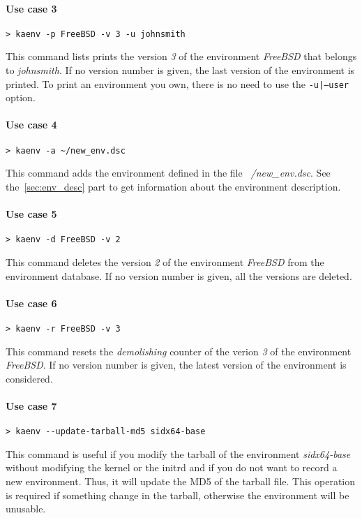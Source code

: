 \documentclass[a4wide,10pt,oneside]{book}
\begin{document}
\paragraph{Use case 3}
\begin{verbatim}
> kaenv -p FreeBSD -v 3 -u johnsmith
\end{verbatim}
This command lists prints the version \textit{3} of the environment \textit{FreeBSD} that belongs to \textit{johnsmith}. If no version number is given, the last version of the environment is printed. To print an environment you own, there is no need to use the \texttt{-u|--user} option.

\paragraph{Use case 4}
\begin{verbatim}
> kaenv -a ~/new_env.dsc
\end{verbatim}
This command adds the environment defined in the file \textit{~/new\_env.dsc}. See the~\ref{sec:env_desc} part to get information about the environment description.

\paragraph{Use case 5}
\begin{verbatim}
> kaenv -d FreeBSD -v 2
\end{verbatim}
This command deletes the version \textit{2} of the environment \textit{FreeBSD} from the environment database. If no version number is given, all the versions are deleted.

\paragraph{Use case 6}
\begin{verbatim}
> kaenv -r FreeBSD -v 3
\end{verbatim}
This command resets the \textit{demolishing} counter of the verion \textit{3} of the environment \textit{FreeBSD}. If no version number is given, the latest version of the environment is considered.

\paragraph{Use case 7}
\begin{verbatim}
> kaenv --update-tarball-md5 sidx64-base
\end{verbatim}
This command is useful if you modify the tarball of the environment \textit{sidx64-base} without modifying the kernel or the initrd and if you do not want to record a new environment. Thus, it will update the MD5 of the tarball file. This operation is required if something change in the tarball, otherwise the environment will be unusable.
\end{document}
